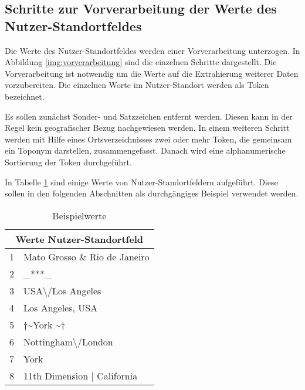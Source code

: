 			

		\subsection{Schritte zur Vorverarbeitung der Werte des Nutzer-Standortfeldes} \label{sub:Vorv}

			Die Werte des Nutzer-Standortfeldes werden einer Vorverarbeitung unterzogen.
			In Abbildung \ref{img:vorverarbeitung} sind die einzelnen Schritte dargestellt.
			Die Vorverarbeitung ist notwendig um die Werte auf die Extrahierung weiterer Daten vorzubereiten.
			Die einzelnen Worte im Nutzer-Standort werden als Token bezeichnet. 
			
			Es sollen zunächst Sonder- und Satzzeichen entfernt werden.
			Diesen kann in der Regel kein geografischer Bezug nachgewiesen werden.
			In einem weiteren Schritt werden mit Hilfe eines Ortsverzeichnisses zwei oder mehr Token, die gemeinsam ein Toponym darstellen, zusammengefasst.
			Danach wird eine alphanumerische Sortierung der Token durchgeführt.

			In Tabelle \ref{tab:VorverarbeitungBsp1} sind einige Werte von Nutzer-Standortfeldern aufgeführt.
			Diese sollen in den folgenden Abschnitten als durchgängiges Beispiel verwendet werden.

				\begin{table}[h]
					\centering
					\caption{Beispielwerte}
					\label{tab:VorverarbeitungBsp1}
					\begin{tabular}{|l|l|}
					\hline 
					\multicolumn{2}{|c|}{\textbf{Werte Nutzer-Standortfeld}} \\ \hline \hline
					1&Mato Grosso \& Rio de Janeiro                      			\\ \hline
					2&\_***\_                                         			\\ \hline
					3&USA\textbackslash /Los Angeles                  			\\ \hline
					4&Los Angeles, USA                                			\\ \hline
					5&$\dagger$\textasciitilde York \textasciitilde$\dagger$      \\ \hline
					6&Nottingham\textbackslash /London                			\\ \hline
					7&York                                            			\\ \hline
					8&11th Dimension | California 					\\ \hline	
					\end{tabular}
				\end{table} 
			 
